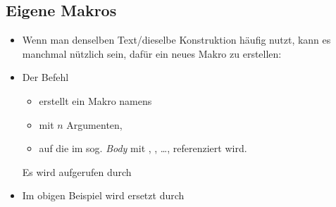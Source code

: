 \subsection{Eigene Makros}

\begin{frame}[fragile]{\subsecname}
    \begin{itemize}
        \item Wenn man denselben Text/dieselbe Konstruktion häufig nutzt, kann es manchmal nützlich
            sein, dafür ein neues \alert{Makro} zu erstellen:
        \item Der Befehl \code{\newcommand{\macro}[n]{...#1...#2...#n...}}
            \begin{itemize}
                \item erstellt ein Makro namens \code{\macro}
                \item mit $n$ Argumenten,
                \item auf die im sog. \textit{Body} mit , , \dots, 
                    referenziert wird.
            \end{itemize}
            Es wird aufgerufen durch 
        \item Im obigen Beispiel wird  ersetzt durch
            \begin{center}
            \end{center}
    \end{itemize}
\end{frame}
